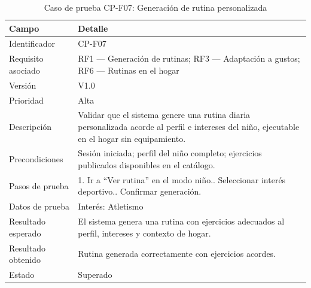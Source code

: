 				\begin{table}[H]
					\centering\small
					\caption{Caso de prueba CP-F07: Generación de rutina personalizada}
					\label{tab:cpf07}
					\begin{tabular}{p{3cm}p{12.0cm}}
						\hline
						\textbf{Campo} & \textbf{Detalle}\\
						\hline
						Identificador & CP-F07\\
						Requisito asociado & RF1 --- Generación de rutinas; RF3 --- Adaptación a gustos; RF6 --- Rutinas en el hogar\\
						Versión & V1.0\\
						Prioridad & Alta\\
						Descripción & Validar que el sistema genere una rutina diaria personalizada acorde al perfil e intereses del niño, ejecutable en el hogar sin equipamiento.\\
						Precondiciones & Sesión iniciada; perfil del niño completo; ejercicios publicados disponibles en el catálogo.\\
						Pasos de prueba & 1. Ir a ``Ver rutina'' en el modo niño.\newline 2. Seleccionar interés deportivo.\newline 3. Confirmar generación.\\
						Datos de prueba & Interés: Atletismo\\
						Resultado esperado & El sistema genera una rutina con ejercicios adecuados al perfil, intereses y contexto de hogar.\\
						Resultado obtenido & Rutina generada correctamente con ejercicios acordes.\\
						Estado & Superado\\
						\hline
					\end{tabular}
				\end{table}
				\tblnote
				
